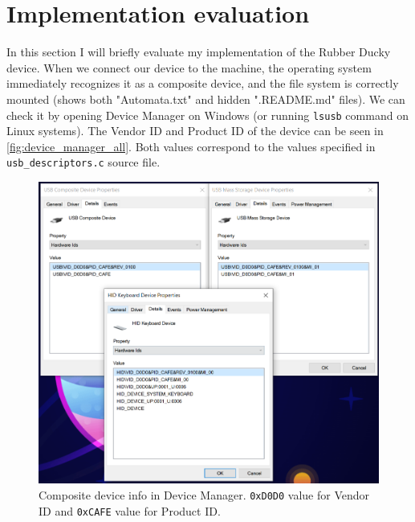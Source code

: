 
\chapter{Implementation evaluation}
\label{ch:evaluation}
In this section I will briefly evaluate my implementation of the Rubber Ducky device. When we connect our device to the machine, the operating system immediately recognizes it as a composite device, and the file system is correctly mounted (shows both "Automata.txt" and hidden ".README.md" files). We can check it by opening Device Manager on Windows (or running \verb|lsusb| command on Linux systems). The Vendor ID and Product ID of the device can be seen in \autoref{fig:device_manager_all}. Both values correspond to the values specified in \verb|usb_descriptors.c| source file.
\begin{figure}[ht]
    \centering
    \includegraphics[width=0.75\linewidth]{./obrazky-figures/device_manager_all.png}
    \caption{Composite device info in Device Manager. \texttt{0xD0D0} value for Vendor ID and \texttt{0xCAFE} value for Product ID.}
    \label{fig:device_manager_all}
\end{figure}

